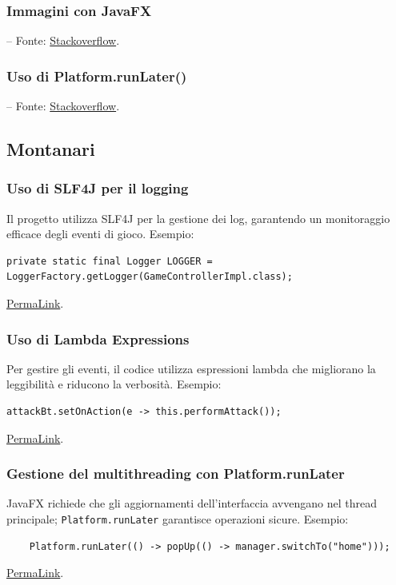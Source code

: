 \documentclass[a4paper,12pt]{report}
\begin{document}
\subsubsection{Immagini con JavaFX} – Fonte: \href{https://stackoverflow.com/questions/52229984/javafx-imageview-actions}{Stackoverflow}.
\subsubsection{Uso di Platform.runLater()} – Fonte: \href{https://stackoverflow.com/questions/13784333/platform-runlater-and-task-in-javafx}{Stackoverflow}.

\subsection{Montanari}
\subsubsection{Uso di SLF4J per il logging}
Il progetto utilizza SLF4J per la gestione dei log, garantendo un monitoraggio efficace degli eventi di gioco.\newline
Esempio:
\begin{verbatim}
private static final Logger LOGGER = LoggerFactory.getLogger(GameControllerImpl.class);
\end{verbatim}
\href{https://github.com/Matt2309/temple-tower/blob/297b37062035f41c3e9258656beace208905a368/src/main/java/it/unibo/templetower/view/CombatView.java#L82}{PermaLink}.

\subsubsection{Uso di Lambda Expressions}
Per gestire gli eventi, il codice utilizza espressioni lambda che migliorano la leggibilità e riducono la verbosità.\newline
Esempio:
\begin{verbatim}
attackBt.setOnAction(e -> this.performAttack());
\end{verbatim}
\href{https://github.com/Matt2309/temple-tower/blob/297b37062035f41c3e9258656beace208905a368/src/main/java/it/unibo/templetower/view/CombatView.java#L178}{PermaLink}.

\subsubsection{Gestione del multithreading con Platform.runLater}
JavaFX richiede che gli aggiornamenti dell'interfaccia avvengano nel thread principale; \texttt{Platform.runLater} garantisce operazioni sicure.\newline
Esempio:
\begin{verbatim}
    Platform.runLater(() -> popUp(() -> manager.switchTo("home")));
\end{verbatim}
\href{https://github.com/Matt2309/temple-tower/blob/297b37062035f41c3e9258656beace208905a368/src/main/java/it/unibo/templetower/view/CombatView.java#L259}{PermaLink}.
\end{document}
